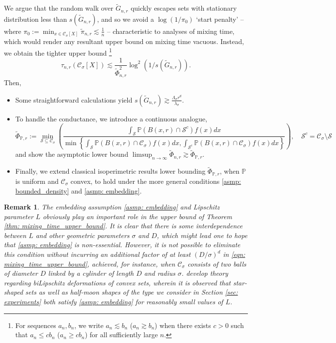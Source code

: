 \documentclass{article}
\newcommand{\set}[1]{\left\{#1\right\}}
\newcommand{\1}{\mathbf{1}}
\newcommand{\Xbf}{X}             %
\newcommand{\Pbb}{\mathbb{P}}
\newcommand{\Cset}{\mathcal{C}}
\newcommand{\Csig}{\Cset_{\sigma}}
\newcommand{\Sset}{\mathcal{S}}
\theoremstyle{aldenthm}
\theoremstyle{aldenrmrk}
\newtheorem{remark}{Remark}
\begin{document}
We argue that the random walk over $\widetilde{G}_{n,r}$ quickly escapes sets with stationary distribution less than $s(\widetilde{G}_{n,r})$, and so we avoid a $\log\left(1/\pi_0\right)$ `start penalty' -- where $\pi_0 := \min_{x \in \Csig[\Xbf]} \widetilde{\pi}_{n,r} \lesssim \frac{1}{n}$ -- characteristic to analyses of mixing time, which would render any resultant upper bound on mixing time vacuous. Instead, we obtain the tighter upper bound \footnote{For sequences $a_n, b_n$, we write $a_n \lesssim b_n$ ($a_n \gtrsim b_n$) when there exists $c > 0$ such that $a_n \leq c b_n$ ($a_n \geq c b_n$) for all sufficiently large $n$.}
\begin{equation*}
\tau_{n,r}(\Csig[\Xbf]) \lesssim \frac{1}{\widetilde{\Phi}_{n,r}^2} \log^2\left(1/s(\widetilde{G}_{n,r})\right).
\end{equation*}
Then,
\begin{itemize}
	\item Some straightforward calculations yield $s(\widetilde{G}_{n,r}) \gtrsim \frac{\Lambda_{\sigma} r^d}{\lambda_{\sigma}}$.
	\item To handle the conductance, we introduce a continuous analogue, 
	\begin{equation}
	\label{eqn: continuous_conductance}
	\widetilde{\Phi}_{\Pbb,r} := \min_{\mathcal{S} \subseteq \Csig} \left(\frac{\int_{\Sset} \Pbb(B(x,r) \cap \Sset^c) f(x) dx}{\min \set{\int_{\Sset} \Pbb(B(x,r) \cap \Csig) f(x) dx, \int_{\Sset^c} \Pbb(B(x,r) \cap \Csig) f(x) dx}}\right), \quad \Sset^c = \Csig \setminus \Sset
	\end{equation}
	and show the asymptotic lower bound $\limsup_{n \to \infty} \widetilde{\Phi}_{n,r} \gtrsim \widetilde{\Phi}_{\Pbb,r}$.
	\item Finally, we extend classical isoperimetric results lower bounding $\widetilde{\Phi}_{\Pbb,r}$, when $\Pbb$ is uniform and $\Csig$ convex, to hold under the more general conditions \ref{asmp: bounded_density} and \ref{asmp: embedding}.
\end{itemize}  

\begin{remark}
	The embedding assumption \ref{asmp: embedding} and Lipschitz parameter $L$ obviously play an important role in the upper bound of Theorem \ref{thm: mixing_time_upper_bound}. It is clear that there is some interdependence between $L$ and other geometric parameters $\sigma$ and $D$, which might lead one to hope that \ref{asmp: embedding} is non-essential. However, it is not possible to eliminate this condition without incurring an additional factor of at least $(D/\sigma)^d$ in \eqref{eqn: mixing_time_upper_bound}, achieved, for instance, when $\Csig$ consists of two balls of diameter $D$ linked by a cylinder of length $D$ and radius $\sigma$. \citep{abbasi-yadkori2016, abbasi-yadkori2016a} develop theory regarding biLipschitz deformations of convex sets, wherein it is observed that star-shaped sets as well as half-moon shapes of the type we consider in Section \ref{sec: experiments} both satisfy \ref{asmp: embedding} for reasonably small values of $L$.
\end{remark}
\end{document}
